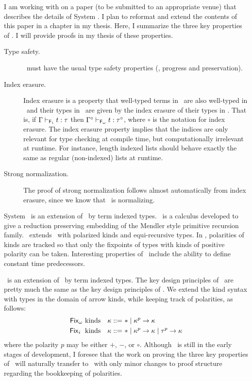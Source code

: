 I am working with on a paper (to be submitted to an appropriate venue) that
describes the details of System \Fi. I plan to reformat and extend
the contents of this paper in a chapter in my thesis. Here, I summarize
the three key properties of \Fi. I will provide proofs in my thesis of
these properties.
\begin{description}
\item[\quad Type safety.]
\Fi\ must have the usual type safety properties (\ie, progress and preservation).

\item[\quad Index erasure.]
Index erasure is a property that well-typed terms in \Fi\ are also 
well-typed in \Fw\, and their types in \Fw\ are given by the index erasure
of their types in \Fi. That is, if $\Gamma |-_{\mathsf{F}_i} t : \tau$ then
$\Gamma^\circ |-_{\mathsf{F}_\omega} t : \tau^\circ$, where $\circ$ is the notation
for index erasure. The index erasure property implies that the indices are
only relevant for type checking at compile time, but computationally irrelevant
at runtime. For instance, length indexed lists should behave exactly the same as
regular (non-indexed) lists at runtime.

\item[\quad Strong normalization.]
The proof of strong normalization follows almost automatically from
index erasure, since we know that \Fw\ is normalizing.
\end{description}

System \Fixi\ is an extension of \Fixw\ by term indexed types. \Fixw\ is a
calculus developed to give a reduction preserving embedding of the Mendler
style primitive recursion family. \Fixw\ extends \Fw\ with polarized kinds
and equi-recursive types. In \Fixi, polarities of kinds are tracked so that
only the fixpoints of types with kinds of positive polarity can be taken.
Interesting properties of \Fixw\ include the ability to define constant
time predecessors.

\Fixi\ is an extension of \Fixw\ by term indexed types. The key design principles
of \Fixi\ are pretty much the same as the key design principles of \Fi.
We extend the kind syntax with types in the domain of arrow kinds,
while keeping track of polarities, as follows:
\begin{align*}
\text{\ensuremath{\mathsf{Fix}_\omega}\ kinds} ~~~ \kappa ::= ~ & * \mid \kappa^p -> \kappa \\
\text{\ensuremath{\mathsf{Fix}_i}\; kinds}~~~ \kappa ::= ~ & * \mid \kappa^p -> \kappa \mid \tau^p -> \kappa
\end{align*}
where the polarity $p$ may be either $+$, $-$, or $\circ$.
Although \Fixi\ is still in the early stages of development, I foresee 
that the work on proving the three key properties of \Fi\ will
naturally transfer to \Fixi\ with only minor changes to proof structure
regarding the bookkeeping of polarities.

